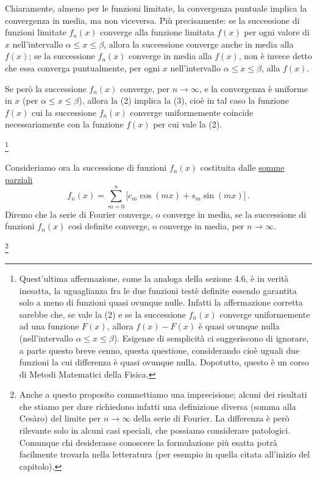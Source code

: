 \documentclass[11pt, a4paper]{book}
\numberwithin{equation}{section}
\begin{document}
Chiaramente, almeno per le funzioni limitate, la convergenza puntuale implica la convergenza in media, ma non viceversa. Più precisamente: se la successione di funzioni limitate $f_n(x)$ converge alla funzione limitata $f(x)$ per ogni valore di $x$ nell'intervallo $\alpha \leq x \leq \beta$, allora la successione converge anche in media alla $f(x)$; se la successione $f_n(x)$ converge in media alla $f(x)$, non è invece detto che essa converga puntualmente, per ogni $x$ nell'intervallo $\alpha \leq x \leq \beta$, alla $f(x)$.

Se però la successione $f_n(x)$ converge, per $n\to\infty$, e la convergenza è uniforme in $x$ (per $\alpha \leq x \leq \beta$), allora la (2) implica la (3), cioè in tal caso la funzione $f(x)$ cui la successione $f_n(x)$ converge uniformemente coincide necessariamente con la funzione $f(x)$ per cui vale la (2).

\footnote{Quest'ultima affermazione, come la analoga della sezione 4.6, è in verità inesatta, la uguaglianza fra le due funzioni testè definite essendo garantita solo a meno di funzioni quasi ovunque nulle. Infatti la affermazione corretta sarebbe che, se vale la (2) e se la successione $f_n(x)$ converge uniformemente ad una funzione $F(x)$, allora $f(x)-F(x)$ è quasi ovunque nulla (nell'intervallo $\alpha \leq x \leq \beta$). Esigenze di semplicità ci suggeriscono di ignorare, a parte questo breve cenno, questa questione, considerando cioè uguali due funzioni la cui differenza è quasi ovunque nulla. Dopotutto, questo è un corso di Metodi Matematici della Fisica.}

Consideriamo ora la successione di funzioni $f_n(x)$ costituita dalle \underline{somme parziali}
\begin{equation}
  f_n(x) = \sum_{m=0}^{n}\bigl[c_m\cos(mx)+s_m\sin(mx)\bigr]\,. \tag{4}
\end{equation}
Diremo che la serie di Fourier converge, o converge in media, se la successione di funzioni $f_n(x)$ così definite converge, o converge in media, per $n\to\infty$.

\footnote{Anche a questo proposito commettiamo una imprecisione; alcuni dei risultati che stiamo per dare richiedono infatti una definizione diversa (somma alla Cesàro) del limite per $n\to\infty$ della serie di Fourier. La differenza è però rilevante solo in alcuni casi speciali, che possiamo considerare patologici. Comunque chi desiderasse conoscere la formulazione più esatta potrà facilmente trovarla nella letteratura (per esempio in quella citata all'inizio del capitolo).}
\end{document}
